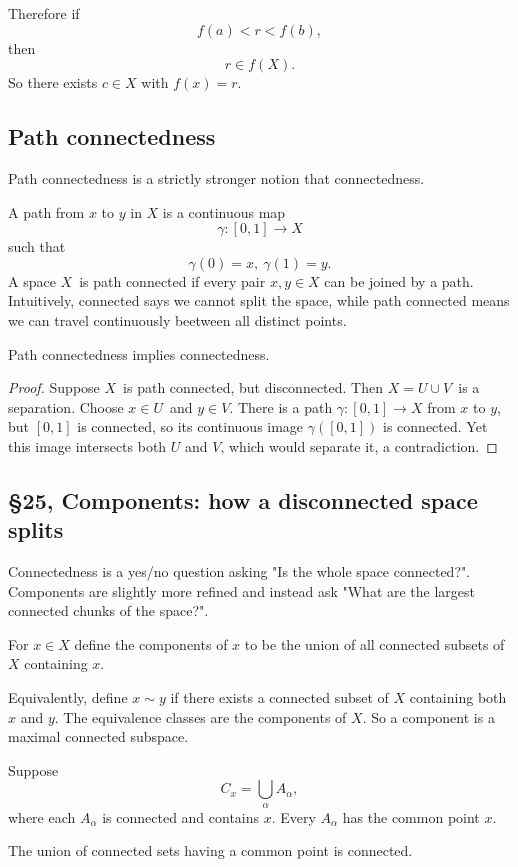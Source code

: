 \documentclass[11pt]{article}
\begin{document}
Therefore if 
\[
    f(a) < r < f(b), 
\]
then 
\[
    r \in f(X). 
\]
So there exists $c \in X$ with $f(x) = r$. 

\subsection{Path connectedness}
Path connectedness is a strictly stronger 
notion that connectedness. 

A path from $x$ to $y$ in $X$ is a continuous 
map 
\[
    \gamma : [0,1] \to X
\]
such that 
\[
    \gamma(0) = x, \ \gamma(1) = y. 
\]
A space $X$ is path connected if every pair 
$x,y \in X$ can be joined by a path. 
Intuitively, connected says we cannot split the space, 
while path connected means we can travel 
continuously beetween all distinct points. 

\begin{prop}
    Path connectedness implies connectedness. 
\end{prop}
\begin{proof}
    Suppose $X$ is path connected, but disconnected. 
    Then $X = U \cup V$ is a separation. 
    Choose $x \in U$ and $y\in V$. 
    There is a path $\gamma : [0,1] \to X$ from 
    $x$ to $y$, but $[0,1]$ is connected, so its 
    continuous image $\gamma([0,1])$ is connected. 
    Yet this image intersects both $U$ and $V$, which 
    would separate it, a contradiction.  
\end{proof}

\subsection{\S 25, Components: how a disconnected space splits}
Connectedness is a yes/no question asking "Is the whole space 
connected?". 
Components are slightly more refined and instead ask 
"What are the largest connected chunks of the space?". 

For $x \in X$ define the components of $x$ to be the 
union of all connected subsets of $X$ containing $x$. 

Equivalently, define $x \sim y$ if there exists 
a connected subset of $X$ containing both $x$ and $y$. 
The equivalence classes are the components of $X$. So 
a component is a maximal connected subspace. 

Suppose 
\[
    C_x = \bigcup_\alpha A_\alpha, 
\]
where each $A_\alpha$ is connected and contains $x$. 
Every $A_\alpha$ has the common point $x$. 

The union of connected sets having a common point is 
connected. 
\end{document}
